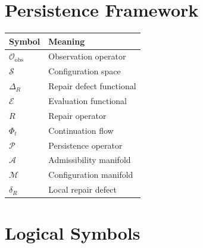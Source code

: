 \documentclass[11pt]{book}
\numberwithin{equation}{chapter}
\theoremstyle{definition}
\theoremstyle{plain}
\begin{document}

\section{Persistence Framework}

\begin{center}

\begin{tabular}{ll}

Symbol & Meaning
\\
\hline

$\mathcal O_{\mathrm{obs}}$ &
Observation operator
\\

$\mathcal S$ &
Configuration space
\\

$\Delta_R$ &
Repair defect functional
\\

$\mathcal E$ &
Evaluation functional
\\

$R$ &
Repair operator
\\

$\Phi_t$ &
Continuation flow
\\

$\mathcal P$ &
Persistence operator
\\

$\mathcal A$ &
Admissibility manifold
\\

$\mathcal M$ &
Configuration manifold
\\

$\delta_R$ &
Local repair defect

\end{tabular}

\end{center}


\section{Logical Symbols}
\end{document}

